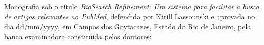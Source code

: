 \begin{titlepage}
\begin{folhadeaprovacao}
    Monografia sob o título \textit{BioSearch Refinement: Um sistema para facilitar a busca de artigos relevantes no PubMed}, defendida por Kirill Lassounski e aprovada no dia dd/mm/yyyy, em Campos dos Goytacazes, Estado do Rio de Janeiro, pela banca examinadora constituída pelos doutores:
    \setlength{\ABNTsignthickness}{0.4pt}
    \setlength{\ABNTsignskip}{2cm}

\end{folhadeaprovacao}
\end{titlepage}
